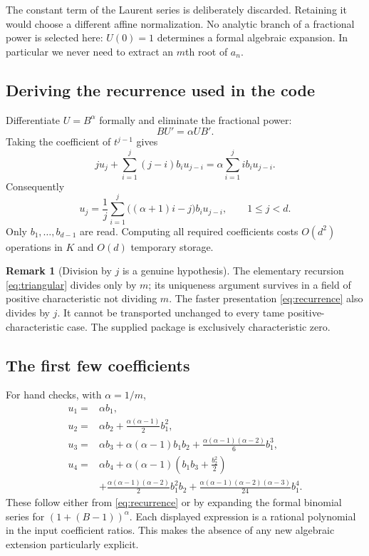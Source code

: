\documentclass[11pt,a4paper]{article}
\theoremstyle{definition}
\newtheorem{remark}[theorem]{Remark}
\begin{document}
The constant term of the Laurent series is deliberately discarded. Retaining it would choose a different affine normalization. No analytic branch of a fractional power is selected here: $U(0)=1$ determines a formal algebraic expansion. In particular we never need to extract an $m$th root of $a_n$.

\subsection{Deriving the recurrence used in the code}
Differentiate $U=B^\alpha$ formally and eliminate the fractional power:
\[
 B U'=\alpha U B'.
\]
Taking the coefficient of $t^{j-1}$ gives
\[
 j u_j+\sum_{i=1}^j(j-i)b_i u_{j-i}
    =\alpha\sum_{i=1}^j i b_i u_{j-i}.
\]
Consequently
\begin{equation}
 \boxed{\displaystyle
 u_j=\frac1j\sum_{i=1}^{j}\bigl((\alpha+1)i-j\bigr)b_i u_{j-i},
 \qquad 1\le j<d.}\label{eq:recurrence}
\end{equation}
Only $b_1,\ldots,b_{d-1}$ are read. Computing all required coefficients costs $O(d^2)$ operations in $K$ and $O(d)$ temporary storage.

\begin{remark}[Division by $j$ is a genuine hypothesis]
The elementary recursion \eqref{eq:triangular} divides only by $m$; its uniqueness argument survives in a field of positive characteristic not dividing $m$. The faster presentation \eqref{eq:recurrence} also divides by $j$. It cannot be transported unchanged to every tame positive-characteristic case. The supplied package is exclusively characteristic zero.
\end{remark}

\subsection{The first few coefficients}
For hand checks, with $\alpha=1/m$,
\begin{align*}
 u_1={}&\alpha b_1,\\
 u_2={}&\alpha b_2+\frac{\alpha(\alpha-1)}2b_1^2,\\
 u_3={}&\alpha b_3+\alpha(\alpha-1)b_1b_2
       +\frac{\alpha(\alpha-1)(\alpha-2)}6b_1^3,\\
 u_4={}&\alpha b_4+\alpha(\alpha-1)\left(b_1b_3+\frac{b_2^2}{2}\right)\\
 &+\frac{\alpha(\alpha-1)(\alpha-2)}2b_1^2b_2
 +\frac{\alpha(\alpha-1)(\alpha-2)(\alpha-3)}{24}b_1^4.
\end{align*}
These follow either from \eqref{eq:recurrence} or by expanding the formal binomial series for $(1+(B-1))^\alpha$. Each displayed expression is a rational polynomial in the input coefficient ratios. This makes the absence of any new algebraic extension particularly explicit.
\end{document}
